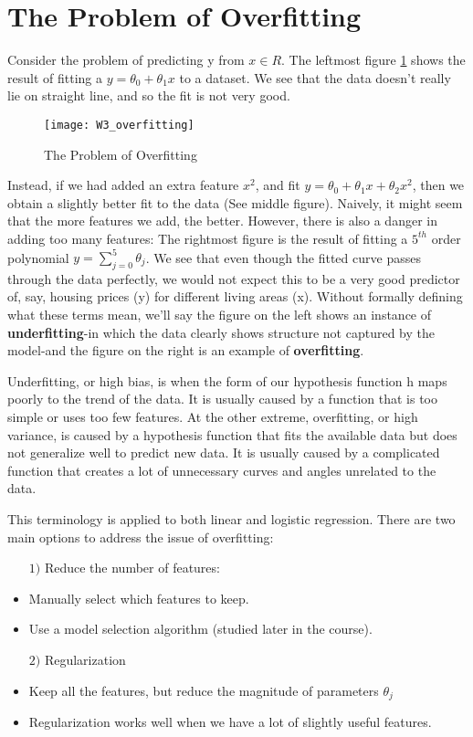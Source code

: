 \section{The Problem of Overfitting}
Consider the problem of predicting y from $x \in R$. The leftmost figure \ref{fig:w3_overfit} shows the result of fitting a $y=\theta_0 + \theta_1 x$ to a dataset. We see that the data doesn't really lie on straight line, and so the fit is not very good.
\begin{figure}[ht]
\center
\texttt{[image: W3\_overfitting]}
\caption{The Problem of Overfitting}
\label{fig:w3_overfit}
\end{figure}

Instead, if we had added an extra feature $x^2$, and fit $y = \theta_0 + \theta_1x + \theta_2x^2$, then we obtain a slightly better fit to the data (See middle figure). Naively, it might seem that the more features we add, the better. However, there is also a danger in adding too many features: The rightmost figure is the result of fitting a $5^{th}$ order polynomial $y = \sum_{j=0} ^5 \theta_j$. We see that even though the fitted curve passes through the data perfectly, we would not expect this to be a very good predictor of, say, housing prices (y) for different living areas (x). Without formally defining what these terms mean, we'll say the figure on the left shows an instance of {\bf underfitting}-in which the data clearly shows structure not captured by the model-and the figure on the right is an example of {\bf overfitting}.

Underfitting, or high bias, is when the form of our hypothesis function h maps poorly to the trend of the data. It is usually caused by a function that is too simple or uses too few features. At the other extreme, overfitting, or high variance, is caused by a hypothesis function that fits the available data but does not generalize well to predict new data. It is usually caused by a complicated function that creates a lot of unnecessary curves and angles unrelated to the data.

This terminology is applied to both linear and logistic regression. There are two main options to address the issue of overfitting:
\begin{itemize}
	\item[$1)$] Reduce the number of features:
	\item	\quad Manually select which features to keep.
	\item	\quad Use a model selection algorithm (studied later in the course).
	\item[$2)$] Regularization
	\item	\quad Keep all the features, but reduce the magnitude of parameters $\theta_j$
	\item	\quad Regularization works well when we have a lot of slightly useful features.
\end{itemize}